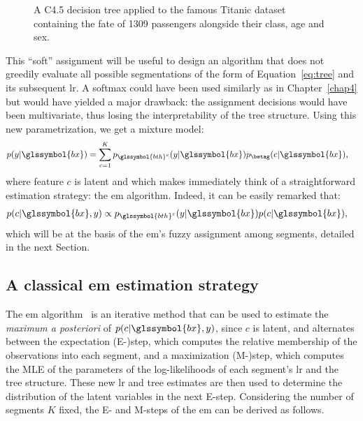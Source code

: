\begin{figure}
\centering \resizebox{\textwidth}{!}{}
\caption{A C4.5 decision tree applied to the famous Titanic dataset containing the fate of 1309 passengers alongside their class, age and sex.}
\label{fig:titanic_tree}
\end{figure}

This ``soft'' assignment will be useful to design an algorithm that does not greedily evaluate all possible segmentations of the form of Equation~\eqref{eq:tree} and its subsequent \gls{lr}. A softmax could have been used similarly as in Chapter~\ref{chap4} but would have yielded a major drawback: the assignment decisions would have been multivariate, thus losing the interpretability of the tree structure. Using this new parametrization, we get a mixture model:
\begin{align*}
p(y | \glssymbol{bx}) & = \sum_{c = 1}^K p_{\glssymbol{bth}^c}(y | \glssymbol{bx}) p_{\betag}(c | \glssymbol{bx}),
\end{align*}
where feature $c$ is latent and which makes immediately think of a straightforward estimation strategy: the \gls{em} algorithm. Indeed, it can be easily remarked that:
\begin{align*}
p(c | \glssymbol{bx}, y) & \propto p_{\glssymbol{bth}^c}(y | \glssymbol{bx}) p(c | \glssymbol{bx}),
\end{align*}
which will be at the basis of the \gls{em}'s fuzzy assignment among segments, detailed in the next Section.

\subsection{A classical \gls{em} estimation strategy}

The \gls{em} algorithm~\cite{dempster1977maximum} is an iterative method that can be used to estimate the \textit{maximum a posteriori} of $p(c | \glssymbol{bx}, y)$, since $c$ is latent, and alternates between the expectation (E-)step, which computes the relative membership of the observations into each segment, and a maximization (M-)step, which computes the MLE of the parameters of the log-likelihoods of each segment's \gls{lr} and the tree structure. These new \gls{lr} and tree estimates are then used to determine the distribution of the latent variables in the next E-step. Considering the number of segments $K$ fixed, the E- and M-steps of the \gls{em} can be derived as follows.


